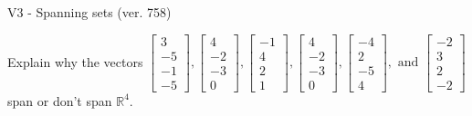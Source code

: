 \begin{exercise}
  \begin{exerciseTitle}V3 - Spanning sets (ver. 758)\end{exerciseTitle}
  \begin{exerciseStatement}
    Explain why the vectors \(\left[\begin{array}{r}
3 \\
-5 \\
-1 \\
-5
\end{array}\right] , \left[\begin{array}{r}
4 \\
-2 \\
-3 \\
0
\end{array}\right] , \left[\begin{array}{r}
-1 \\
4 \\
2 \\
1
\end{array}\right] , \left[\begin{array}{r}
4 \\
-2 \\
-3 \\
0
\end{array}\right] , \left[\begin{array}{r}
-4 \\
2 \\
-5 \\
4
\end{array}\right] , \text{ and } \left[\begin{array}{r}
-2 \\
3 \\
2 \\
-2
\end{array}\right]\) span or don't span \(\mathbb{R}^4\). 
	



\end{exerciseStatement}
\end{exercise}
